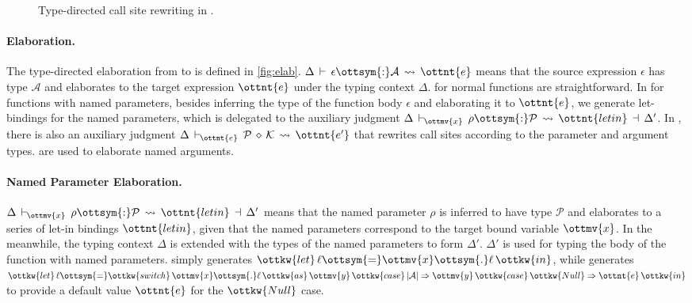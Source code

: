 \begin{figure}
\IUdefnpmatch{}
\caption{Type-directed call site rewriting in \uaena.} \label{fig:match}
\end{figure}

\paragraph{Elaboration.}
The type-directed elaboration from \uaena to \lambdaiu is defined in
\autoref{fig:elab}. $\Delta  \,\vdash\,  \epsilon  \ottsym{:}  \mathcal{A}  \,\rightsquigarrow\,  \ottnt{e}$ means that the source
expression $\epsilon$ has type $\mathcal{A}$ and elaborates to the target expression
$\ottnt{e}$ under the typing context $\Delta$.  for normal
functions are straightforward. In  for functions with named
parameters, besides inferring the type of the function body $\epsilon$ and
elaborating it to $\ottnt{e}$, we generate let-bindings for the named parameters,
which is delegated to the auxiliary judgment $ \Delta \,\vdash\, _{\!\!\!\! \ottmv{x} }\:\: \rho \ottsym{:} \mathcal{P} \,\rightsquigarrow\, \ottnt{letin} \,\dashv\, \Delta' $.
In , there is also an auxiliary judgment $ \Delta \,\vdash\, _{\!\!\!\! \ottnt{e} }\:\: \mathcal{P} \,\diamond\, \mathcal{K} \,\rightsquigarrow\, \ottnt{e'} $
that rewrites call sites according to the parameter and argument types.
 are used to elaborate named arguments.

\paragraph{Named Parameter Elaboration.}
$ \Delta \,\vdash\, _{\!\!\!\! \ottmv{x} }\:\: \rho \ottsym{:} \mathcal{P} \,\rightsquigarrow\, \ottnt{letin} \,\dashv\, \Delta' $ means that the named parameter
$\rho$ is inferred to have type $\mathcal{P}$ and elaborates to a series of let-in
bindings $\ottnt{letin}$, given that the named parameters correspond to the target
bound variable $\ottmv{x}$. In the meanwhile, the typing context $\Delta$ is extended
with the types of the named parameters to form $\Delta'$. $\Delta'$ is used for
typing the body of the function with named parameters. 
simply generates $\ottkw{let} \, \ell  \ottsym{=}  \ottmv{x}  \ottsym{.}  \ell \, \ottkw{in}$, while  generates
$\ottkw{let} \, \ell  \ottsym{=}  \ottkw{switch} \, \ottmv{x}  \ottsym{.}  \ell \, \ottkw{as} \, \ottmv{y} \, \ottkw{case} \, |  \mathcal{A}  |  \Rightarrow  \ottmv{y} \, \ottkw{case} \, \ottkw{Null}  \Rightarrow  \ottnt{e} \, \ottkw{in}$ to provide a
default value $\ottnt{e}$ for the $\ottkw{Null}$ case.

